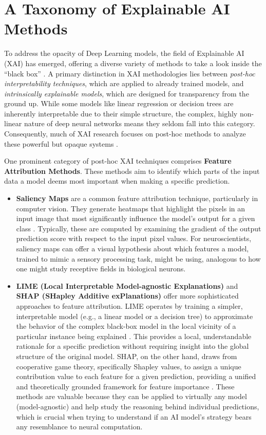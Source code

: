 \documentclass[11pt,a4paper]{article}
\begin{document}
\section{A Taxonomy of Explainable AI Methods}

To address the opacity of Deep Learning models, the field of Explainable AI (XAI) has emerged, offering a diverse variety of methods to take a look inside the ``black box'' \cite{doshi2017towards, miller2019explanation}. A primary distinction in XAI methodologies lies between \textit{post-hoc interpretability techniques}, which are applied to already trained models, and \textit{intrinsically explainable models}, which are designed for transparency from the ground up. While some models like linear regression or decision trees are inherently interpretable due to their simple structure, the complex, highly non-linear nature of deep neural networks means they seldom fall into this category. Consequently, much of XAI research focuses on post-hoc methods to analyze these powerful but opaque systems \cite{doshi2017towards}.

One prominent category of post-hoc XAI techniques comprises \textbf{Feature Attribution Methods}. These methods aim to identify which parts of the input data a model deems most important when making a specific prediction.
\begin{itemize}
    \item \textbf{Saliency Maps} are a common feature attribution technique, particularly in computer vision. They generate heatmaps that highlight the pixels in an input image that most significantly influence the model's output for a given class \cite{fong2017interpretable}. Typically, these are computed by examining the gradient of the output prediction score with respect to the input pixel values. For neuroscientists, saliency maps can offer a visual hypothesis about which features a model, trained to mimic a sensory processing task, might be using, analogous to how one might study receptive fields in biological neurons.
    \item \textbf{LIME (Local Interpretable Model-agnostic Explanations)} and \textbf{SHAP (SHapley Additive exPlanations)} offer more sophisticated approaches to feature attribution. LIME operates by training a simpler, interpretable model (e.g., a linear model or a decision tree) to approximate the behavior of the complex black-box model in the local vicinity of a particular instance being explained \cite{ribeiro2016why}. This provides a local, understandable rationale for a specific prediction without requiring insight into the global structure of the original model. SHAP, on the other hand, draws from cooperative game theory, specifically Shapley values, to assign a unique contribution value to each feature for a given prediction, providing a unified and theoretically grounded framework for feature importance \cite{lundberg2017unified}. These methods are valuable because they can be applied to virtually any model (model-agnostic) and help study the reasoning behind individual predictions, which is crucial when trying to understand if an AI model's strategy bears any resemblance to neural computation.
\end{itemize}
\end{document}
